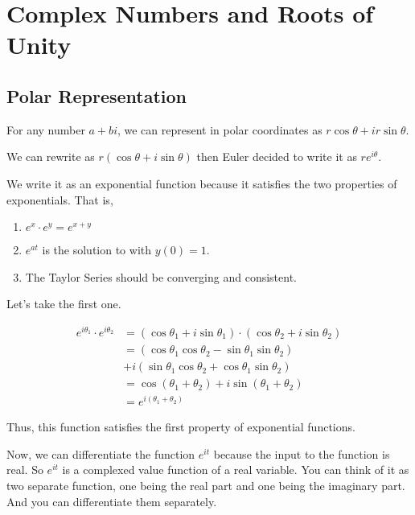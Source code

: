

\chapter{Complex Numbers and Roots of Unity} 

\bigbreak

\section{Polar Representation}

For any number $a + bi$, we can represent in polar coordinates as $r \cos \theta + i r \sin \theta$.

We can rewrite as  $r(\cos \theta + i \sin \theta)$ then Euler decided to write it as $r e^{i \theta}$.

We write it as an exponential function because it satisfies the two properties of exponentials.
That is,
\begin{enumerate}
    \item $e^x \cdot e^y = e^{x+y}$
    \item $e^{at}$ is the solution to  with $y(0) = 1$.
    \item The Taylor Series should be converging and consistent.
\end{enumerate}

Let's take the first one.

\begin{align*}
e^{i\theta_1} \cdot e^{i \theta_2} 
    & = (\cos \theta_1 + i \sin \theta_1) \cdot (\cos \theta_2 + i \sin \theta_2) \\
    & = (\cos \theta_1 \cos \theta_2 - \sin \theta_1 \sin \theta_2) \\
    & + i (\sin \theta_1 \cos \theta_2 + \cos \theta_1 \sin \theta_2) \\
    & = \cos (\theta_1 + \theta_2) + i \sin (\theta_1 + \theta_2) \\
    & = e^{i(\theta_1 + \theta_2)}
\end{align*}

Thus, this function satisfies the first property of exponential functions.

Now, we can differentiate the function $e^{it}$ because the input to the function is real.
So $e^{it}$ is a complexed value function of a real variable. 
You can think of it as two separate function, one being the real part and one being the imaginary part.
And you can differentiate them separately.

